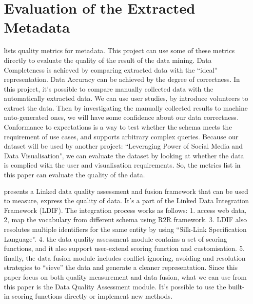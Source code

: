 \section{Evaluation of the Extracted Metadata}


\cite{ochoa2006} lists quality metrics for metadata. This project can use some of these metrics directly to evaluate the quality of the result of the data mining. Data Completeness is achieved by comparing extracted data with the ``ideal'' representation. Data Accuracy can be achieved by the degree of correctness. In this project, it's possible to compare manually collected data with the automatically extracted data. We can use user studies, by introduce volunteers to extract the data. Then by investigating the manually collected results to machine auto-generated ones, we will have some confidence about our data correctness. Conformance to expectations is a way to test whether the schema meets the requirement of use cases, and supports arbitrary complex queries. Because our dataset will be used by another project: ``Leveraging Power of Social Media and Data Visualisation", we can evaluate the dataset by looking at whether the data is complied with the user and visualisation requirements. So, the metrics list in this paper can evaluate the quality of the data.

\cite{mendes2012} presents a Linked data quality assessment and fusion framework that can be used to measure, express the quality of data. It's a part of the Linked Data Integration Framework (LDIF). The integration process works as follows: 1. access web data, 2, map the vocabulary from different schema using R2R framework. 3. LDIF also resolutes multiple identifiers for the same entity by using ``Silk-Link Specification Language''. 4. the data quality assessment module contains a set of scoring functions, and it also support user-extend scoring function and customisation. 5. finally, the data fusion module includes conflict ignoring, avoiding and resolution strategies to ``sieve'' the data and generate a cleaner representation. Since this paper focus on both quality measurement and data fusion, what we can use from this paper is the Data Quality Assessment module. It's possible to use the built-in scoring functions directly or implement new methods.

